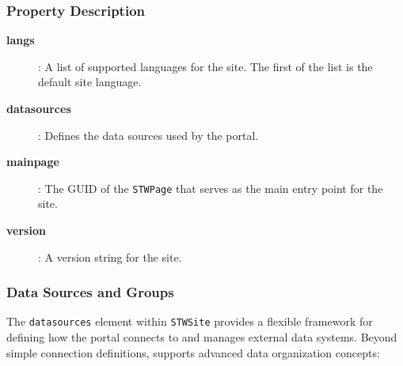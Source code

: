 \subsubsection{Property Description}

\begin{description}
\item[\textbf{langs}]: A list of supported languages for the site. The first of the list is the default site language.
\item[\textbf{datasources}]: Defines the data sources used by the portal.
\item[\textbf{mainpage}]: The GUID of the \texttt{STWPage} that serves as the main entry point for the site.
\item[\textbf{version}]: A version string for the site.
\end{description}

\subsubsection{Data Sources and Groups}
\label{sec:datasources-groups}

The \texttt{datasources} element within \texttt{STWSite} provides a flexible framework for defining how the portal connects to and manages external data systems. Beyond simple connection definitions, \wbdl{} supports advanced data organization concepts:

